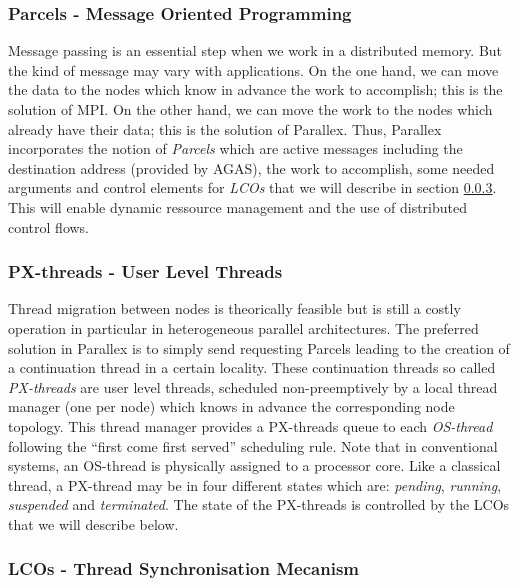 \documentclass[conference]{acmsig-alternate-10pt}
\begin{document}
\subsubsection{Parcels - Message Oriented Programming}
Message passing is an essential step when we work in a distributed memory. But the kind of message may vary with applications. On the one hand, we can move the data to the nodes which know in advance the work to accomplish; this is the solution of MPI. On the other hand, we can move the work to the nodes which already have their data; this is the solution of Parallex. Thus, Parallex incorporates the notion of \emph{Parcels} \cite{Parallex} which are active messages including the destination address (provided by AGAS), the work to accomplish, some needed arguments and control elements for \emph{LCOs} that we will describe in section \ref{lcos}. This will enable dynamic ressource management and the use of distributed control flows.

\subsubsection{PX-threads - User Level Threads}
Thread migration between nodes is theorically feasible but is still a costly operation in particular in heterogeneous parallel architectures. The preferred solution in Parallex is to simply send requesting Parcels leading to the creation of a continuation thread in a certain locality. These continuation threads so called \emph{PX-threads} \cite{Parallex} are user level threads, scheduled non-preemptively by a local thread manager (one per node) which knows in advance the corresponding node topology. This thread manager provides a PX-threads queue to each \emph{OS-thread} \cite{Parallex} following the \enquote{first come first served} scheduling rule. Note that in conventional systems, an OS-thread is physically assigned to a processor core. Like a classical thread, a PX-thread may be in four different states which are: \emph{pending}, \emph{running}, \emph{suspended} and \emph{terminated}. The state of the PX-threads is controlled by the LCOs that we will describe below.

\subsubsection{LCOs - Thread Synchronisation Mecanism}\label{lcos}
\end{document}

